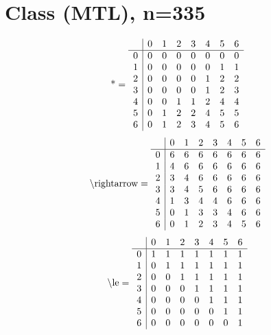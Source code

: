 \documentclass[11pt]{article}
\begin{document}
\section{Class (MTL), n=335}
\[\text{*} = 
\begin{array}{r | r r r r r r r}
 & 0 & 1 & 2 & 3 & 4 & 5 & 6 \\ \hline
0 & 0 & 0 & 0 & 0 & 0 & 0 & 0 \\
1 & 0 & 0 & 0 & 0 & 0 & 1 & 1 \\
2 & 0 & 0 & 0 & 0 & 1 & 2 & 2 \\
3 & 0 & 0 & 0 & 0 & 1 & 2 & 3 \\
4 & 0 & 0 & 1 & 1 & 2 & 4 & 4 \\
5 & 0 & 1 & 2 & 2 & 4 & 5 & 5 \\
6 & 0 & 1 & 2 & 3 & 4 & 5 & 6 \\
\end{array}
\]
\[\text{\textbackslash rightarrow} = 
\begin{array}{r | r r r r r r r}
 & 0 & 1 & 2 & 3 & 4 & 5 & 6 \\ \hline
0 & 6 & 6 & 6 & 6 & 6 & 6 & 6 \\
1 & 4 & 6 & 6 & 6 & 6 & 6 & 6 \\
2 & 3 & 4 & 6 & 6 & 6 & 6 & 6 \\
3 & 3 & 4 & 5 & 6 & 6 & 6 & 6 \\
4 & 1 & 3 & 4 & 4 & 6 & 6 & 6 \\
5 & 0 & 1 & 3 & 3 & 4 & 6 & 6 \\
6 & 0 & 1 & 2 & 3 & 4 & 5 & 6 \\
\end{array}
\]
\[\text{\textbackslash le} = 
\begin{array}{r | r r r r r r r}
 & 0 & 1 & 2 & 3 & 4 & 5 & 6 \\ \hline
0 & 1 & 1 & 1 & 1 & 1 & 1 & 1 \\
1 & 0 & 1 & 1 & 1 & 1 & 1 & 1 \\
2 & 0 & 0 & 1 & 1 & 1 & 1 & 1 \\
3 & 0 & 0 & 0 & 1 & 1 & 1 & 1 \\
4 & 0 & 0 & 0 & 0 & 1 & 1 & 1 \\
5 & 0 & 0 & 0 & 0 & 0 & 1 & 1 \\
6 & 0 & 0 & 0 & 0 & 0 & 0 & 1 \\
\end{array}
\]
\end{document}
